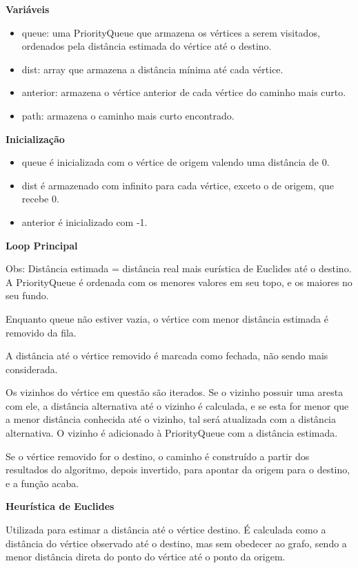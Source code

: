 \documentclass[
	12pt,				%
	oneside,			%
	a4paper,			%
	english,			%
	brazil,				%
	]{abntex2}
\begin{document}
{\textbf{Variáveis}

\begin{itemize}
    \item queue: uma PriorityQueue que armazena os vértices a serem visitados, ordenados pela distância estimada do vértice até o destino.
    \item dist: array que armazena a distância mínima até cada vértice.
    \item anterior: armazena o vértice anterior de cada vértice do caminho mais curto.
    \item path: armazena o caminho mais curto encontrado.
\end{itemize}
\textbf{Inicialização}

\begin{itemize}
    \item queue é inicializada com o vértice de origem valendo uma distância de 0.
    \item dist é armazenado com infinito para cada vértice, exceto o de origem, que recebe 0.
    \item anterior é inicializado com -1.
\end{itemize}

\textbf{Loop Principal}

Obs: Distância estimada = distância real mais eurística de Euclides até o destino. A PriorityQueue é ordenada com os menores valores em seu topo, e os maiores no seu fundo.

Enquanto queue não estiver vazia, o vértice com menor distância estimada é removido da fila.

A distância até o vértice removido é marcada como fechada, não sendo mais considerada.

Os vizinhos do vértice em questão são iterados. Se o vizinho possuir uma aresta com ele, a distância alternativa até o vizinho é calculada, e se esta for menor que a menor distância conhecida até o vizinho, tal será atualizada com a distância alternativa. O vizinho é adicionado à PriorityQueue com a distância estimada.

Se o vértice removido for o destino, o caminho é construído a partir dos resultados do algoritmo, depois invertido, para apontar da origem para o destino, e a função acaba.

\textbf{Heurística de Euclides}

Utilizada para estimar a distância até o vértice destino. É calculada como a distância do vértice observado até o destino, mas sem obedecer ao grafo, sendo a menor distância direta do ponto do vértice até o ponto da origem.

}
\end{document}
